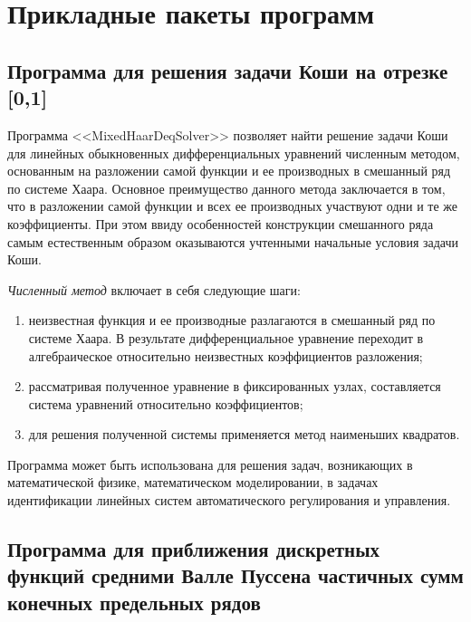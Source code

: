 \chapter{Прикладные пакеты программ}


\section{Программа  для решения задачи Коши на отрезке [0,1]}

Программа <<MixedHaarDeqSolver>> позволяет найти решение задачи Коши для линейных обыкновенных дифференциальных уравнений численным методом, основанным на разложении самой функции и ее производных в смешанный ряд по системе Хаара. Основное преимущество данного метода заключается в том, что в разложении самой функции и всех ее производных участвуют одни и те же коэффициенты. При этом ввиду особенностей конструкции смешанного ряда самым естественным образом оказываются учтенными начальные условия задачи Коши.

\textit{Численный метод }включает в себя следующие шаги:
\begin{enumerate}[1)]
  \item неизвестная функция и ее производные разлагаются в смешанный ряд по системе Хаара. В результате дифференциальное уравнение переходит в алгебраическое относительно неизвестных коэффициентов разложения;
  \item рассматривая полученное уравнение в фиксированных узлах, составляется система уравнений относительно коэффициентов;
  \item для решения полученной системы применяется метод наименьших квадратов.
\end{enumerate}


Программа может быть использована для решения задач, возникающих в математической физике, математическом моделировании, в задачах идентификации линейных систем автоматического регулирования и управления.







\section{Программа для приближения дискретных функций средними Валле Пуссена частичных сумм конечных предельных рядов}

